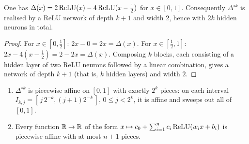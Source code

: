 \documentclass[11pt,a4paper]{article}
\begin{document}
\begin{center}
\end{center}

\begin{lemma}\label{lem:saw-deep}
One has $\Delta(x) = 2\operatorname{ReLU}(x) - 4\operatorname{ReLU}(x - \tfrac12)$ for $x \in [0,1]$. Consequently
$\Delta^{\circ k}$ is realised by a ReLU network of depth $k+1$ and width $2$, hence with $2k$
hidden neurons in total.
\end{lemma}

\begin{proof}
For $x \in [0,\tfrac12]$: $2x - 0 = 2x = \Delta(x)$. For $x \in [\tfrac12,1]$:
$2x - 4(x - \tfrac12) = 2 - 2x = \Delta(x)$. Composing $k$ blocks, each consisting of a hidden layer
of two ReLU neurons followed by a linear combination, gives a network of depth $k+1$ (that is, $k$
hidden layers) and width $2$.
\end{proof}

\begin{lemma}\label{lem:saw-pieces}
\begin{enumerate}[label=(\roman*)]
\item $\Delta^{\circ k}$ is piecewise affine on $[0,1]$ with exactly $2^k$ pieces: on each interval
$I_{k,j} = [\,j\,2^{-k}, (j+1)2^{-k}\,]$, $0 \le j < 2^k$, it is affine and sweeps out all of
$[0,1]$.
\item Every function $\mathbb{R} \to \mathbb{R}$ of the form
$x \mapsto c_0 + \sum_{i=1}^n c_i \operatorname{ReLU}(w_i x + b_i)$ is piecewise affine with at most $n+1$ pieces.
\end{enumerate}
\end{lemma}
\end{document}
